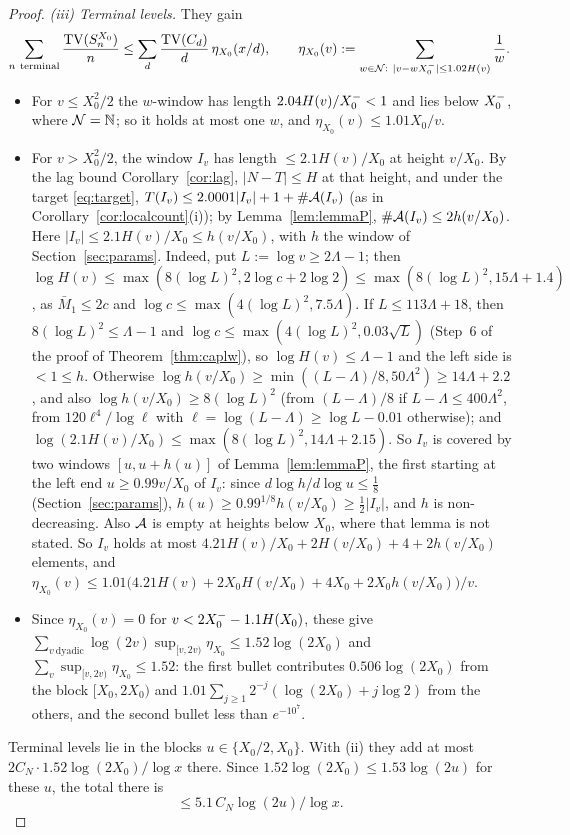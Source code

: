 \begin{proof}
\emph{(iii) Terminal levels.} They gain
\[
  \sum_{n\ \text{terminal}}\frac{\TV(S^{X_0}_n)}n\le\sum_d\frac{\TV(C_d)}d\,\eta_{X_0}(x/d),\qquad
  \eta_{X_0}(v):=\sum_{w\in\NN:\ |v-w\Xm|\le1.02H(v)}\frac1w .
\]
\begin{itemize}
\item For $v\le X_0^2/2$ the $w$-window has length $2.04H(v)/X_0^{-}<1$ and lies below $X_0^{-}$, where $\mathcal{N}=\mathbb{N}$; so it holds at most
  one $w$, and $\eta_{X_0}(v)\le1.01X_0/v$.
\item For $v>X_0^2/2$, the window $I_v$ has length $\le2.1H(v)/X_0$ at height $v/X_0$. By the lag bound
  Corollary~\ref{cor:lag}, $|N-T|\le H$ at that height, and under the target \eqref{eq:target}, $T(I_v)\le2.0001|I_v|+1+\#\mathcal{A}(I_v)$ (as in Corollary~\ref{cor:localcount}(i));
  by Lemma~\ref{lem:lemmaP}, $\#\mathcal{A}(I_v)\le2h(v/X_0)$. Here $|I_v|\le2.1H(v)/X_0\le h(v/X_0)$, with $h$ the window of
  Section~\ref{sec:params}. Indeed, put $L:=\log v\ge2\Lambda-1$; then $\log H(v)\le\max(8(\log L)^2,2\log c+2\log2)\le
  \max(8(\log L)^2,15\Lambda+1.4)$, as $\bar M_1\le2c$ and $\log c\le\max(4(\log L)^2,7.5\Lambda)$. If $L\le113\Lambda+18$, then
  $8(\log L)^2\le\Lambda-1$ and $\log c\le\max(4(\log L)^2,0.03\sqrt L)$ (Step~6 of the proof of Theorem~\ref{thm:caplw}), so
  $\log H(v)\le\Lambda-1$ and the left side is $<1\le h$. Otherwise $\log h(v/X_0)\ge\min((L-\Lambda)/8,50\Lambda^2)\ge14\Lambda+2.2$, and
  also $\log h(v/X_0)\ge8(\log L)^2$ (from $(L-\Lambda)/8$ if $L-\Lambda\le400\Lambda^2$, from $120\ell^4/\log\ell$ with
  $\ell=\log(L-\Lambda)\ge\log L-0.01$ otherwise); and $\log(2.1H(v)/X_0)\le\max(8(\log L)^2,14\Lambda+2.15)$.
  So $I_v$ is covered
  by two windows $[u,u+h(u)]$ of Lemma~\ref{lem:lemmaP}, the first starting at the left end $u\ge0.99v/X_0$ of $I_v$: since
  $d\log h/d\log u\le\frac18$ (Section~\ref{sec:params}), $h(u)\ge0.99^{1/8}h(v/X_0)\ge\frac12|I_v|$, and $h$ is non-decreasing. Also
 $\mathcal{A}$ is empty at heights below $X_0$, where that lemma is not
  stated.
  So $I_v$ holds at most
  $4.21H(v)/X_0+2H(v/X_0)+4+2h(v/X_0)$ elements, and
  $\eta_{X_0}(v)\le1.01\bigl(4.21H(v)+2X_0H(v/X_0)+4X_0+2X_0h(v/X_0)\bigr)/v$.
\item Since $\eta_{X_0}(v)=0$ for $v<2X_0^{-}-1.1H(X_0)$, these give
  $\sum_{v\ \text{dyadic}}\log(2v)\sup_{[v,2v)}\eta_{X_0}\le1.52\log(2X_0)$ and $\sum_v\sup_{[v,2v)}\eta_{X_0}\le1.52$: the first
  bullet contributes $0.506\log(2X_0)$ from the block $[X_0,2X_0)$ and $1.01\sum_{j\ge1}2^{-j}(\log(2X_0)+j\log2)$ from the
  others, and the second bullet less than $e^{-10^7}$.
\end{itemize}
Terminal levels lie in the blocks $u\in\{X_0/2,X_0\}$. With (ii) they add at most $2C_N\cdot1.52\log(2X_0)/\allowbreak\log x$ there.
Since $1.52\log(2X_0)\le1.53\log(2u)$ for these $u$, the total there is
\[
  \le5.1\,C_N\log(2u)/\log x.
\]


\end{proof}
